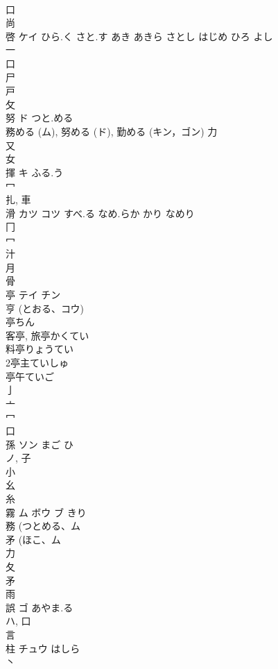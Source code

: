\documentclass[8pt]{extreport}
\begin{document}
\begin{CJK}{UTF8}{min}
\\	口 
\\	尚 
\\	啓	ケイ	ひら.く さと.す あき あきら さとし はじめ ひろ よし	
\\	一 
\\	口 
\\	尸 
\\	戸 
\\	攵 
\\	努	ド	つと.める	
\\	務める (ム), 努める (ド), 勤める (キン，ゴン)			力 
\\	又 
\\	女 
\\	揮	キ	ふる.う	
\\	冖 
\\	扎, 車 
\\	滑	カツ コツ	すべ.る なめ.らか かり なめり	
\\	冂 
\\	冖 
\\	汁 
\\	月 
\\	骨 
\\	亭	テイ チン		
\\	亨 (とおる、コウ) 
\\	亭ちん
\\	客亭, 旅亭かくてい
\\	料亭りょうてい
\\	2亭主ていしゅ
\\	亭午ていご
\\	亅 
\\	亠 
\\	冖 
\\	口 
\\	孫	ソン	まご ひ	
\\	ノ, 子 
\\	小 
\\	幺 
\\	糸 
\\	霧	ム ボウ ブ	きり	
\\	務 (つとめる、ム 
\\	矛 (ほこ、ム 
\\	力 
\\	夂 
\\	矛 
\\	雨 
\\	誤	ゴ	あやま.る	
\\	ハ, 口 
\\	言 
\\	柱	チュウ	はしら	
\\	丶 

\end{CJK}
\end{document}
